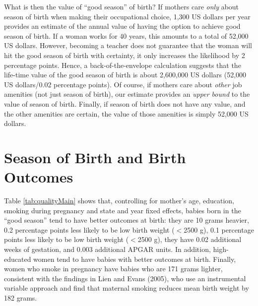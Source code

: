\documentclass[a4paper, 12 pt]{article}
\theoremstyle{plain}
\begin{document}
\begin{doublespace}
What is then the value of ``good season'' of birth? If mothers care \emph{only} about season of birth when making their occupational choice, 1,300 US dollars per year provides an estimate of the annual value of having the option to achieve good season of birth. If a woman works for 40 years, this amounts to a total of 52,000 US dollars. However, becoming a teacher does not guarantee that the woman will hit the good season of birth with certainty, it only increases the likelihood by 2 percentage points. Hence, a back-of-the-envelope calculation suggests that the life-time value of the good season of birth is about 2,600,000 US dollars (52,000 US dollars/0.02 percentage points). Of course, if mothers care about \emph{other} job amenities (not just season of birth), our estimate provides an \emph{upper bound} to the value of season of birth. Finally, if season of birth does not have any value, and the other amenities are certain, the value of those amenities is simply 52,000 US dollars.


\newpage
\section{Season of Birth and Birth Outcomes}
\label{scn:birthoutcomes}
Table \ref{tab:qualityMain} shows that, controlling for mother's age, education, smoking during pregnancy and state and year fixed effects, babies born in the ``good season'' tend to have better  outcomes at birth: they are 10 grams heavier, 0.2 percentage points less likely to be low birth weight ($<$2500 g), 0.1 percentage points less likely to be low birth weight ($<$2500 g), they have 0.02 additional weeks of gestation, and 0.003 additional APGAR units. In addition, high-educated women tend to have babies with better outcomes at birth. Finally, women who smoke in pregnancy have babies who are 171 grams lighter, consistent with the findings in Lien and Evans (2005), who use an instrumental variable approach and find that maternal smoking reduces mean birth weight by 182 grams.


\end{doublespace}
\end{document}
